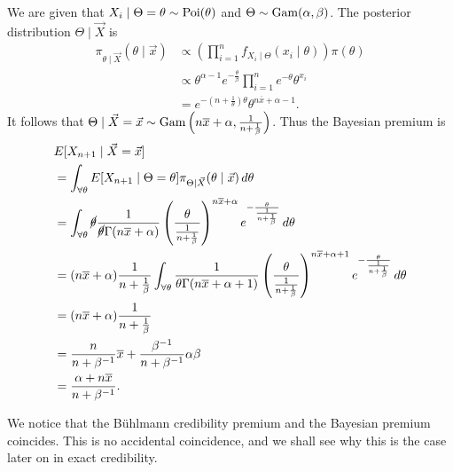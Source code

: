 \documentclass[notoc,notitlepage]{tufte-book}
\begin{document}
\begin{solution}
  \noindent
   We are given that $X_i \mid \Theta = \theta \sim
  \operatorname{Poi}(\theta)$ and $\Theta \sim \operatorname{Gam}(\alpha, \beta)$. The posterior
  distribution $\Theta \mid \vec{X}$ is
  \begin{align*}
    \pi_{\theta \mid \vec{X}}(\theta \mid \vec{x})
    &\propto \left( \prod_{i=1}^{n} f_{X_i \mid \Theta}(x_i \mid \theta) \right)
      \pi(\theta) \\
    &\propto \theta^{\alpha - 1} e^{-\frac{\theta}{\beta}} \prod_{i=1}^{n}
      e^{-\theta} \theta^{x_i} \\
    &= e^{-(n + \frac{1}{\theta}) \theta} \theta^{n \overline{x} + \alpha - 1}.
  \end{align*}
  It follows that $\Theta \mid \vec{X} = \vec{x} \sim \operatorname{Gam}\left(n \overline{x} +
  \alpha, \frac{1}{n + \frac{1}{\beta}}\right)$. Thus the Bayesian premium is
  \begin{align*}
    &E[X_{n+1} \mid \vec{X} = \vec{x}] \\
    &= \int_{\forall \theta} E[X_{n+1} \mid \Theta = \theta] \pi_{\Theta \mid
      \vec{X}}(\theta \mid \vec{x}) \mathop{}\!d{\theta} \\
    &= \int_{\forall \theta} \cancel{\theta} \frac{1}{\cancel{\theta} \Gamma(n
      \overline{x} + \alpha)} \left( \frac{\theta}{\frac{1}{n + \frac{1}{\beta}}}
      \right)^{n \overline{x} + \alpha} e^{- \frac{\theta}{\frac{1}{n +
      \frac{1}{\beta}}}} \mathop{}\!d{\theta} \\
    &= (n \overline{x} + \alpha) \frac{1}{n + \frac{1}{\beta}}
      \int_{\forall \theta} \frac{1}{\theta \Gamma(n \overline{x} + \alpha + 1)}
      \left( \frac{\theta}{\frac{1}{n + \frac{1}{\beta}}} \right)^{n
      \overline{x} + \alpha + 1} e^{-\frac{\theta}{\frac{1}{n +
      \frac{1}{\beta}}}} \mathop{}\!d{\theta} \\
    &= (n \overline{x} + \alpha) \frac{1}{n + \frac{1}{\beta}} \\
    &= \frac{n}{n + \beta^{-1}} \overline{x} + \frac{\beta^{-1}}{n + \beta^{-1}}
      \alpha\beta \\
    &= \frac{\alpha + n \overline{x}}{n + \beta^{-1}}.
  \end{align*}
\end{solution}

\begin{note}
  We notice that the B\"{u}hlmann credibility premium and the Bayesian premium
  coincides. This is no accidental coincidence, and we shall see why this is the
  case later on in exact credibility.
\end{note}
\end{document}

